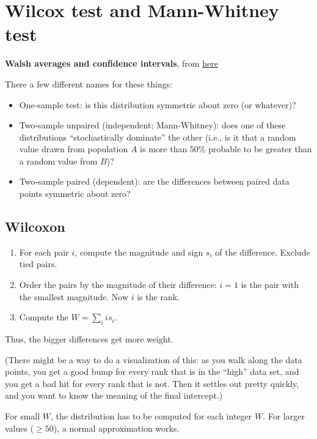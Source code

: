\section{Wilcox test and Mann-Whitney
test}\label{wilcox-test-and-mann-whitney-test}

\textbf{Walsh averages and confidence intervals}, from
\href{http://www.stat.umn.edu/geyer/old03/5102/notes/rank.pdf}{here}

There a few different names for these things:

\begin{itemize}
\tightlist
\item
  One-sample test: is this distribution symmetric about zero (or
  whatever)?
\item
  Two-sample unpaired (independent; Mann-Whitney): does one of these
  distributions ``stochastically dominate'' the other (i.e., is it that
  a random value drawn from population \(A\) is more than 50\% probable
  to be greater than a random value from \(B\))?
\item
  Two-sample paired (dependent): are the differences between paired data
  points symmetric about zero?
\end{itemize}

\subsection{Wilcoxon}\label{wilcoxon}

\begin{enumerate}
\def\labelenumi{\arabic{enumi}.}
\tightlist
\item
  For each pair \(i\), compute the magnitude and sign \(s_i\) of the
  difference. Exclude tied pairs.
\item
  Order the pairs by the magnitude of their difference: \(i=1\) is the
  pair with the smallest magnitude. Now \(i\) is the rank.
\item
  Compute the \(W = \sum_i i s_i\).
\end{enumerate}

Thus, the bigger differences get more weight.

(There might be a way to do a visualization of this: as you walk along
the data points, you get a good bump for every rank that is in the
``high'' data set, and you get a bad hit for every rank that is not.
Then it settles out pretty quickly, and you want to know the meaning of
the final intercept.)

For small \(W\), the distribution has to be computed for each integer
\(W\). For larger values (\(\geq 50\)), a normal approximation works.

